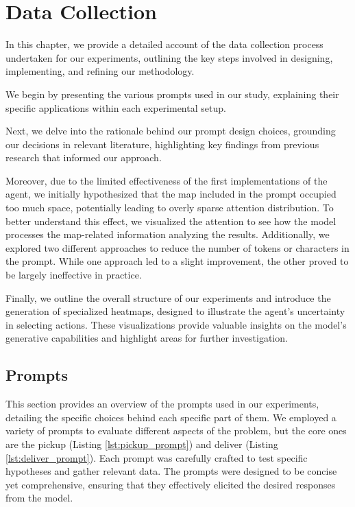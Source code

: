 \chapter{Data Collection}
\label{cha:data_collection}

In this chapter, we provide a detailed account of the data collection process undertaken
for our experiments, outlining the key steps involved in designing, implementing,
and refining our methodology.

We begin by presenting the various prompts used in our study, explaining their specific
applications within each experimental setup.

Next, we delve into the rationale behind our prompt design choices, grounding our
decisions in relevant literature, highlighting key findings from previous
research that informed our approach.

Moreover, due to the limited effectiveness of the first implementations of the agent,
we initially hypothesized that the map included in the prompt occupied too much
space, potentially leading to overly sparse attention distribution. To better
understand this effect, we visualized the attention to see how the model processes
the map-related information analyzing the results. Additionally, we explored two
different approaches to reduce the number of tokens or characters in the prompt.
While one approach led to a slight improvement, the other proved to be largely ineffective
in practice.

Finally, we outline the overall structure of our experiments and introduce the
generation of specialized heatmaps, designed to illustrate the agent's uncertainty
in selecting actions. These visualizations provide valuable insights on the
model's generative capabilities and highlight areas for further investigation.

\section{Prompts}
\label{sec:prompts}

This section provides an overview of the prompts used in our experiments,
detailing the specific choices behind each specific part of them. We employed a variety
of prompts to evaluate different aspects of the problem, but the core ones are
the pickup (Listing \ref{lst:pickup_prompt}) and deliver (Listing \ref{lst:deliver_prompt}).
Each prompt was carefully crafted to test specific hypotheses and gather relevant
data. The prompts were designed to be concise yet comprehensive, ensuring that they
effectively elicited the desired responses from the model.

